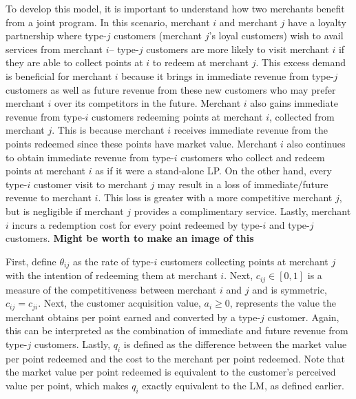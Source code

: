To develop this model, it is important to understand how two merchants benefit from a joint program. In this scenario, merchant $i$ and merchant $j$ have a loyalty partnership where type-$j$ customers (merchant $j$'s loyal customers) wish to avail services from merchant $i$-- type-$j$ customers are more likely to visit merchant $i$ if they are able to collect points at $i$ to redeem at merchant $j$. This excess demand is beneficial for merchant $i$ because it brings in immediate revenue from type-$j$ customers as well as future revenue from these new customers who may prefer merchant $i$ over its competitors in the future. Merchant $i$ also gains immediate revenue from type-$i$ customers redeeming points at merchant $i$, collected from merchant $j$. This is because merchant $i$ receives immediate revenue from the points redeemed since these points have market value. Merchant $i$ also continues to obtain immediate revenue from type-$i$ customers who collect and redeem points at merchant $i$ as if it were a stand-alone LP. On the other hand, every type-$i$ customer visit to merchant $j$ may result in a loss of immediate/future revenue to merchant $i$. This loss is greater with a more competitive merchant $j$, but is negligible if merchant $j$ provides a complimentary service. Lastly, merchant $i$ incurs a redemption cost for every point redeemed by type-$i$ and type-$j$ customers. \textbf{Might be worth to make an image of this}

First, define $\theta_{ij}$ as the rate of type-$i$ customers collecting points at merchant $j$ with the intention of redeeming them at merchant $i$. Next, $c_{ij} \in [0, 1]$ is a measure of the competitiveness between merchant $i$ and $j$ and is symmetric, \ie\ $c_{ij} = c_{ji}$. Next, the customer acquisition value, $a_i \geq 0$, represents the value the merchant obtains per point earned and converted by a type-$j$ customer. Again, this can be interpreted as the combination of immediate and future revenue from type-$j$ customers. Lastly, $q_i$ is defined as the difference between the market value per point redeemed and the cost to the merchant per point redeemed. Note that the market value per point redeemed is equivalent to the customer's perceived value per point, which makes $q_i$ exactly equivalent to the LM, as defined earlier. 

